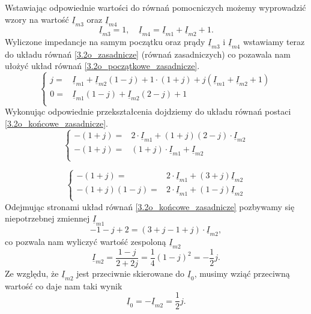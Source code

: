 \documentclass[12pt, a4paper]{article}
\begin{document}
Wstawiając odpowiednie wartości do równań pomocniczych możemy wyprowadzić wzory
na wartość $\underline{I}_{m3}$ oraz $\underline{I}_{m4}$
\begin{equation*}
  \underline{I}_{m3} = 1, \quad \underline{I}_{m4} = \underline{I}_{m1} +
  \underline{I}_{m2} + 1.
\end{equation*}
Wyliczone impedancje na samym początku oraz prądy $\underline{I}_{m3}$ i
$\underline{I}_{m4}$ wstawiamy teraz do układu równań \ref{3.2o_zasadnicze}
(równań zasadniczych) co pozawala nam ułożyć układ równań \ref{3.2o_początkowe_zasadnicze}.
\begin{equation}\label{3.2o_początkowe_zasadnicze}
  \left\{
  \begin{array}{rl}
    j = & \underline{I}_{m1} + \underline{I}_{m2}(1-j)+1\cdot(1+j)+j(\underline{I}_{m1}+\underline{I}_{m2}+1) \\
    0 = & \underline{I}_{m1}(1-j)+\underline{I}_{m2}(2-j)+1                                                   \\
  \end{array}
  \right.
\end{equation}
Wykonując odpowiednie przekształcenia dojdziemy do układu równań postaci
\ref{3.2o_końcowe_zasadnicze}.
\begin{equation*}
  \left\{
  \begin{array}{rl}
    -(1+j) = & 2\cdot\underline{I}_{m1}+(1+j)(2-j)\cdot\underline{I}_{m2} \\
    -(1+j) = & (1+j)\cdot\underline{I}_{m1} + \underline{I}_{m2}          \\
  \end{array}
  \right.
\end{equation*}

\begin{equation}\label{3.2o_końcowe_zasadnicze}
  \left\{
  \begin{array}{rl}
    -(1+j) =      & 2\cdot\underline{I}_{m1} + (3+j)\underline{I}_{m2} \\
    -(1+j)(1-j) = & 2\cdot\underline{I}_{m1} + (1-j)\underline{I}_{m2} \\
  \end{array}
  \right.
\end{equation}
Odejmując stronami układ równań \ref{3.2o_końcowe_zasadnicze} pozbywamy się
niepotrzebnej zmiennej $\underline{I}_{m1}$
\begin{equation*}
  -1-j+2 = (3+j-1+j)\cdot\underline{I}_{m2},
\end{equation*}
co pozwala nam wyliczyć wartość zespoloną $\underline{I}_{m2}$
\begin{equation*}
  \underline{I}_{m2} = \frac{1-j}{2+2j} = \frac{1}{4}(1-j)^2 = -\frac{1}{2}j.
\end{equation*}
Ze względu, że $\underline{I}_{m2}$ jest przeciwnie skierowane do $\underline{I}_0$,
musimy wziąć przeciwną wartość co daje nam taki wynik
\begin{equation*}
  \underline{I}_0 = - \underline{I}_{m2} = \frac{1}{2}j.
\end{equation*}
\end{document}

